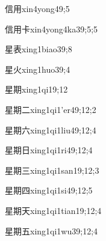 \begin{verbete}{信用}{xin4yong4}{9;5}
\end{verbete}

\begin{verbete}{信用卡}{xin4yong4ka3}{9;5;5}
\end{verbete}

\begin{verbete}{星表}{xing1biao3}{9;8}
\end{verbete}

\begin{verbete}{星火}{xing1huo3}{9;4}
\end{verbete}

\begin{verbete}{星期}{xing1qi1}{9;12}
\end{verbete}

\begin{verbete}{星期二}{xing1qi1'er4}{9;12;2}
\end{verbete}

\begin{verbete}{星期六}{xing1qi1liu4}{9;12;4}
\end{verbete}

\begin{verbete}{星期日}{xing1qi1ri4}{9;12;4}
\end{verbete}

\begin{verbete}{星期三}{xing1qi1san1}{9;12;3}
\end{verbete}

\begin{verbete}{星期四}{xing1qi1si4}{9;12;5}
\end{verbete}

\begin{verbete}{星期天}{xing1qi1tian1}{9;12;4}
\end{verbete}

\begin{verbete}{星期五}{xing1qi1wu3}{9;12;4}
\end{verbete}

